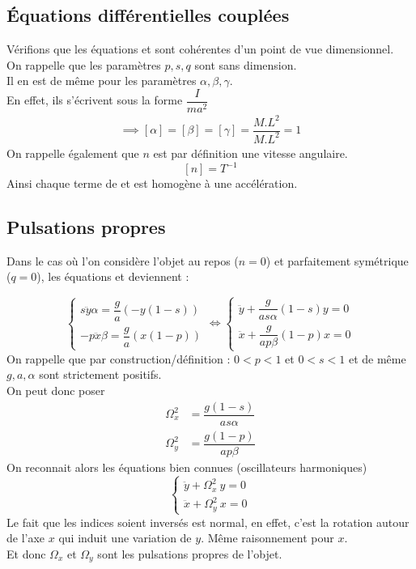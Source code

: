 \documentclass[12pt,a4paper]{article}
\makeatletter
\renewcommand*{\eqref}[1]{%
	\hyperref[{#1}]{\textup{\tagform@{\ref*{#1}}}}%
}
\makeatother
\begin{document}
	\subsection{Équations différentielles couplées}
	\label{subsec:dimension-equations}
	Vérifions que les équations \eqref{eq:equa-diff-couplées1} et \eqref{eq:equa-diff-couplées2} sont cohérentes d'un point de vue dimensionnel.\\
	On rappelle que les paramètres $p,s,q$ sont sans dimension.\\
	Il en est de même pour les paramètres $\alpha,\beta,\gamma$.\\
	En effet, ils s'écrivent sous la forme $\dfrac{I}{ma^2}$
	\begin{align*}
	\implies [\alpha]=[\beta]=[\gamma]=\dfrac{M.L^2}{M.L^2}=1
	\end{align*}
	On rappelle également que $n$ est par définition \eqref{subsec:omega} une vitesse angulaire. $$[n]=T^{-1}$$
	Ainsi chaque terme de \eqref{eq:equa-diff-couplées1} et \eqref{eq:equa-diff-couplées2} est homogène à une accélération.
	
	\subsection{Pulsations propres}
	\label{subsec:pulsations-propres}
	Dans le cas où l'on considère l'objet au repos ($n=0$) et parfaitement symétrique ($q=0$), les équations \eqref{eq:equa-diff-couplées1} et \eqref{eq:equa-diff-couplées2} deviennent :
	
	\[
	\begin{cases}
	s\ddot{y}\alpha=\dfrac{g}{a}(-y(1-s))\\[2ex]
	-p\ddot{x}\beta=\dfrac{g}{a}(x(1-p))
	\end{cases}
	\iff
	\begin{cases}
	\ddot{y}+\dfrac{g}{as\alpha}(1-s)y=0\\[2ex]
	\ddot{x}+\dfrac{g}{ap\beta}(1-p)x=0
	\end{cases}
	\]
	On rappelle que par construction/définition : $0<p<1$ et $0<s<1$ et de même $g,a,\alpha$ sont strictement positifs.\\
	
	On peut donc poser
	\begin{align*}
	\Omega_x^2&=\dfrac{g(1-s)}{as\alpha}\\[2ex]
	\Omega_y^2&=\dfrac{g(1-p)}{ap\beta}
	\end{align*}
	On reconnait alors les équations bien connues (oscillateurs harmoniques)
	\[
	\begin{cases}
	\ddot{y}+\Omega_x^2\ y=0\\[2ex]
	\ddot{x}+\Omega_y^2\ x=0
	\end{cases}
	\]
	Le fait que les indices soient inversés est normal, en effet, c'est la rotation autour de l'axe $x$ qui induit une variation de $y$. Même raisonnement pour $x$.\\
	Et donc $\Omega_x$ et $\Omega_y$ sont les pulsations propres de l'objet.
	
\end{document}

